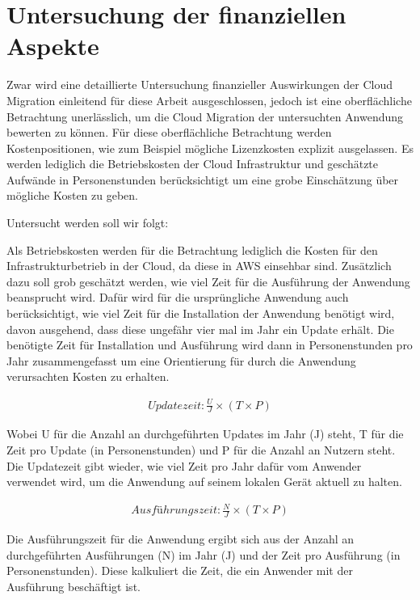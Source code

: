 \section{Untersuchung der finanziellen Aspekte}
Zwar wird eine detaillierte Untersuchung finanzieller Auswirkungen der Cloud Migration einleitend für diese Arbeit ausgeschlossen, jedoch ist eine oberflächliche Betrachtung unerlässlich, um die Cloud Migration der untersuchten Anwendung bewerten zu können. Für diese oberflächliche Betrachtung werden Kostenpositionen, wie zum Beispiel mögliche Lizenzkosten explizit ausgelassen. Es werden lediglich die Betriebskosten der Cloud Infrastruktur und geschätzte Aufwände in Personenstunden berücksichtigt um eine grobe Einschätzung über mögliche Kosten zu geben.

Untersucht werden soll wir folgt:

Als Betriebskosten werden für die Betrachtung lediglich die Kosten für den Infrastrukturbetrieb in der Cloud, da diese in \ac{AWS} einsehbar sind. Zusätzlich dazu soll grob geschätzt werden, wie viel Zeit für die Ausführung der Anwendung beansprucht wird. Dafür wird für die ursprüngliche Anwendung auch berücksichtigt, wie viel Zeit für die Installation der Anwendung benötigt wird, davon ausgehend, dass diese ungefähr vier mal im Jahr ein Update erhält. Die benötigte Zeit für Installation und Ausführung wird dann in Personenstunden pro Jahr zusammengefasst um eine Orientierung für durch die Anwendung verursachten Kosten zu erhalten.

\begin{align}
    Updatezeit: \frac{U}{J} \times \left(T \times P\right) 
\end{align}

Wobei U für die Anzahl an durchgeführten Updates im Jahr (J) steht, T für die Zeit pro Update (in Personenstunden) und P für die Anzahl an Nutzern steht. Die Updatezeit gibt wieder, wie viel Zeit pro Jahr dafür vom Anwender verwendet wird, um die Anwendung auf seinem lokalen Gerät aktuell zu halten.

\begin{align}
    Ausführungszeit: \frac{N}{J} \times \left(T \times P\right) 
\end{align}

Die Ausführungszeit für die Anwendung ergibt sich aus der Anzahl an durchgeführten Ausführungen (N) im Jahr (J) und der Zeit pro Ausführung (in Personenstunden). Diese kalkuliert die Zeit, die ein Anwender mit der Ausführung beschäftigt ist. \pagebreak

